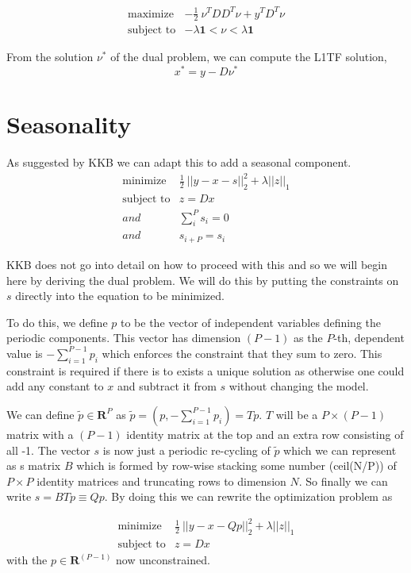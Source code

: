 \documentclass{article}
\begin{document}
\begin{eqnarray}
\mbox{maximize} & -\frac{1}{2} ~ \nu^T D D^T \nu + y^T D^T \nu \\
\mbox{subject to} & - \lambda \mathbf{1} < \nu < \lambda \mathbf{1}
\end{eqnarray}

From the solution $\nu^*$ of the dual problem, we can compute the L1TF solution,
\[
x^* = y - D \nu^*
\]

\section{Seasonality}

As suggested by KKB we can adapt this to add a seasonal component.
\begin{eqnarray}
\mbox{minimize} & \frac{1}{2} ~ || y - x -s||_2^2  + \lambda ||z||_1 \\
\mbox{subject to} & z = D x \\
and & \sum_i^P s_i = 0\\
and & s_{i+P} = s_i
\end{eqnarray}

KKB does not go into detail on how to proceed with this and so we will begin here by deriving
the dual problem. We will do this by putting the constraints on $s$ directly into the
equation to be minimized.

To do this, we define $p$ to be the vector of independent variables defining the periodic components.
This vector has dimension $(P-1)$ as the $P$-th, dependent value is $-\sum_{i=1}^{P-1} p_i$ which enforces the constraint that
they sum to zero. This constraint is required if there is to exists a unique solution as otherwise one could add
any constant to $x$ and subtract it from $s$ without changing the model.

We can define $\tilde{p} \in \mathbf{R}^{P}$ as $\tilde{p} = \left( p,-\sum_{i=1}^{P-1} p_i \right) = T p$.
$T$ will be a $P \times (P-1)$ matrix with a $(P-1)$ identity matrix at the top and an extra row consisting of all -1.
The vector $s$ is now just a periodic re-cycling of $\tilde{p}$ which we can represent as s matrix $B$ which is formed by
row-wise stacking some number (ceil(N/P)) of $P \times P$ identity matrices and truncating rows to dimension $N$. So finally
we can write $s = B T p \equiv Q p$. By doing this we can rewrite the optimization problem as

\begin{eqnarray}
\mbox{minimize} & \frac{1}{2} ~ || y - x - Q p||_2^2  + \lambda ||z||_1 \\
\mbox{subject to} & z = D x
\end{eqnarray}
with the $p \in \mathbf{R}^{(P-1)}$ now unconstrained.
\end{document}
